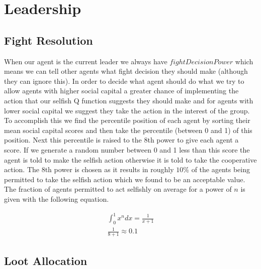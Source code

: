 \section {Leadership}

\subsection{Fight Resolution}

When our agent is the current leader we always have $fightDecisionPower$ which means we can tell other agents what fight decision they should make (although they can ignore this). In order to decide what agent should do what we try to allow agents with higher social capital a greater chance of implementing the action that our selfish Q function suggests they should make and for agents with lower social capital we suggest they take the action in the interest of the group. To accomplish this we find the percentile position of each agent by sorting their mean social capital scores and then take the percentile (between 0 and 1) of this position. Next this percentile is raised to the 8th power to give each agent a score. If we generate a random number between 0 and 1 less than this score the agent is told to make the selfish action otherwise it is told to take the cooperative action. The 8th power is chosen as it results in roughly $10\%$ of the agents being permitted to take the selfish action which we found to be an acceptable value. The fraction of agents permitted to act selfishly on average for a power of $n$ is given with the following equation.

\begin{align*}
\int^1_0 x^n dx = \frac{1}{x+1} \\
\frac{1}{8+1} \approx 0.1
\end{align*}

\subsection{Loot Allocation}

